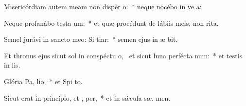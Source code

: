 \item Misericórdiam autem meam non dispér  o:~* neque nocébo in ve a:
\item Neque profanábo testa um:~* et quæ procédunt de lábiis meis, non  rita.
\item Semel jurávi in sancto meo: Si  tiar:~* semen ejus in æ bit.
\item Et thronus ejus sicut sol in conspéctu o,~\pscross{} et sicut luna perfécta  num:~* et testis in  lis.
\item Glória Pa,  lio,~* et Spi to.
\item Sicut erat in princípio, et ,  per,~* et in sǽcula sæ. men.
